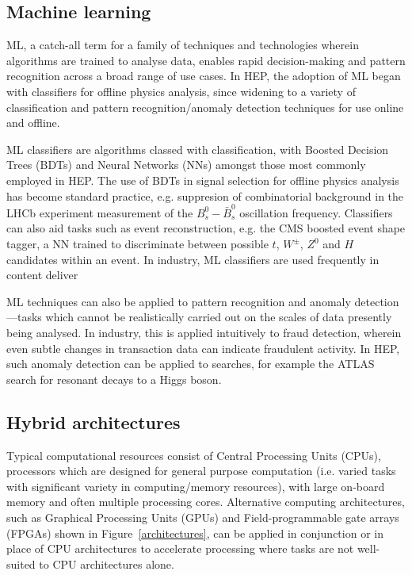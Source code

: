 \subsection{Machine learning}
\label{machine-learning}
ML, a catch-all term for a family of techniques and technologies wherein algorithms are trained to analyse data, enables rapid decision-making and pattern recognition across a broad range of use cases. \cite{intro-ml} In HEP, the adoption of ML began with classifiers for offline physics analysis, since widening to a variety of classification and pattern recognition/anomaly detection techniques for use online and offline. \cite{albertsson-ml}\par

ML classifiers are algorithms classed with classification, with Boosted Decision Trees (BDTs) and Neural Networks (NNs) amongst those most commonly employed in HEP. The use of BDTs in signal selection for offline physics analysis has become standard practice, e.g. suppresion of combinatorial background in the LHCb experiment measurement of the $B_s^0-\bar{B}_s^0$ oscillation frequency. \cite{delta-ms} Classifiers can also aid tasks such as event reconstruction, e.g. the CMS boosted event shape tagger, a NN trained to discriminate between possible $t$, $W^\pm$, $Z^0$ and $H$ candidates within an event. \cite{CMS-best} In industry, ML classifiers are used frequently in content deliver\par

ML techniques can also be applied to pattern recognition and anomaly detection—tasks which cannot be realistically carried out on the scales of data presently being analysed. In industry, this is applied intuitively to fraud detection, wherein even subtle changes in transaction  data can indicate fraudulent activity. In HEP, such anomaly detection can be applied to searches, for example the ATLAS search for resonant decays to a Higgs boson. \cite{anomaly-hep}

\subsection{Hybrid architectures}
\label{hybrid-architectures}
Typical computational resources consist of Central Processing Units (CPUs), processors which are designed for general purpose computation (i.e. varied tasks with significant variety in computing/memory resources), with large on-board memory and often multiple processing cores. Alternative computing architectures, such as Graphical Processing Units (GPUs) and Field-programmable gate arrays (FPGAs) shown in Figure~\ref{architectures}, can be applied in conjunction or in place of CPU architectures to accelerate processing where tasks are not well-suited to CPU architectures alone. \par

